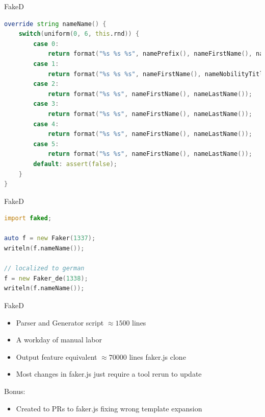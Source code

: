 \documentclass[aspectratio=169,notes]{beamer}
\begin{document}
	\begin{frame}[fragile]{FakeD}
\begin{lstlisting}[language=D,basicstyle=\tiny\ttfamily]
override string nameName() {
	switch(uniform(0, 6, this.rnd)) {
		case 0:
			return format("%s %s %s", namePrefix(), nameFirstName(), nameLastName());
		case 1:
			return format("%s %s %s", nameFirstName(), nameNobilityTitlePrefix(), nameLastName());
		case 2:
			return format("%s %s", nameFirstName(), nameLastName());
		case 3:
			return format("%s %s", nameFirstName(), nameLastName());
		case 4:
			return format("%s %s", nameFirstName(), nameLastName());
		case 5:
			return format("%s %s", nameFirstName(), nameLastName());
		default: assert(false);
	}
}
\end{lstlisting}
	\end{frame}

	\begin{frame}[fragile]{FakeD}
\begin{lstlisting}[language=D]
import faked;

auto f = new Faker(1337);
writeln(f.nameName());

// localized to german
f = new Faker_de(1338);
writeln(f.nameName());
\end{lstlisting}
	\end{frame}

	\begin{frame}[fragile]{FakeD}
		\begin{itemize}
			\item Parser and Generator script $\approx 1500$ lines
			\item A workday of manual labor
			\item Output feature equivalent $\approx 70000$ lines faker.js clone
			\item Most changes in faker.js just require a tool rerun to update
		\end{itemize}
		\pause
		Bonus:
		\begin{itemize}
			\item Created to PRs to faker.js fixing wrong template expansion	
		\end{itemize}
	\end{frame}
\end{document}

